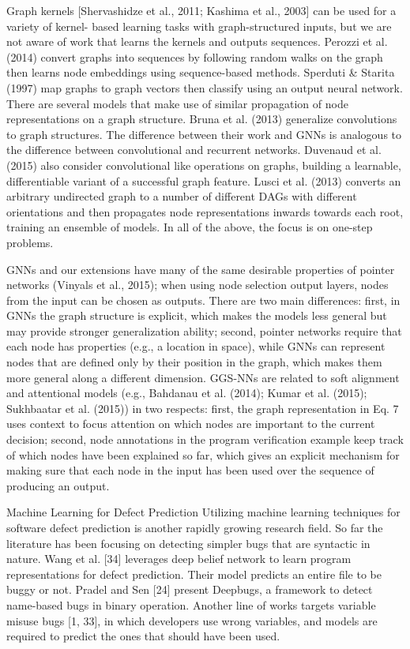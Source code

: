 \documentclass{article}
\begin{document}
Graph kernels [Shervashidze et al., 2011; Kashima et al., 2003] can be used for a variety of kernel- based learning tasks with graph-structured inputs, but we are not aware of work that learns the kernels and outputs sequences. Perozzi et al. (2014) convert graphs into sequences by following random walks on the graph then learns node embeddings using sequence-based methods. Sperduti \& Starita (1997) map graphs to graph vectors then classify using an output neural network. There are several models that make use of similar propagation of node representations on a graph structure. Bruna et al. (2013) generalize convolutions to graph structures. The difference between their work and GNNs is analogous to the difference between convolutional and recurrent networks. Duvenaud et al. (2015) also consider convolutional like operations on graphs, building a learnable, differentiable variant of a successful graph feature. Lusci et al. (2013) converts an arbitrary undirected graph to a number of different DAGs with different orientations and then propagates node representations inwards towards each root, training an ensemble of models. In all of the above, the focus is on one-step problems.

GNNs and our extensions have many of the same desirable properties of pointer networks (Vinyals et al., 2015); when using node selection output layers, nodes from the input can be chosen as outputs. There are two main differences: first, in GNNs the graph structure is explicit, which makes the models less general but may provide stronger generalization ability; second, pointer networks require that each node has properties (e.g., a location in space), while GNNs can represent nodes that are defined only by their position in the graph, which makes them more general along a different dimension.
GGS-NNs are related to soft alignment and attentional models (e.g., Bahdanau et al. (2014); Kumar et al. (2015); Sukhbaatar et al. (2015)) in two respects: first, the graph representation in Eq. 7 uses context to focus attention on which nodes are important to the current decision; second, node annotations in the program verification example keep track of which nodes have been explained so far, which gives an explicit mechanism for making sure that each node in the input has been used over the sequence of producing an output.

Machine Learning for Defect Prediction Utilizing machine learning techniques for software defect prediction is another rapidly growing research field. So far the literature has been focusing on detecting simpler bugs that are syntactic in nature. Wang et al. [34] leverages deep belief network to learn program representations for defect prediction. Their model predicts an entire file to be buggy or not. Pradel and Sen [24] present Deepbugs, a framework to detect name-based bugs in binary operation. Another line of works targets variable misuse bugs [1, 33], in which developers use wrong variables, and models are required to predict the ones that should have been used. 
\end{document}
